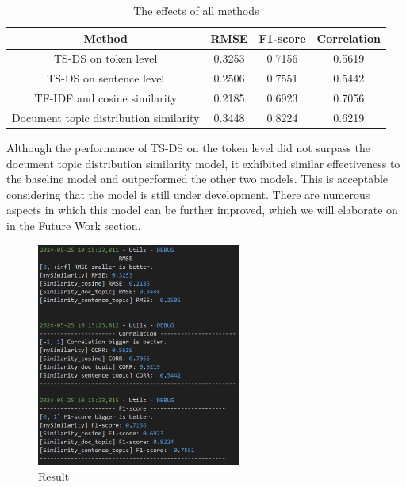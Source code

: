 \documentclass[UTF8]{ctexart}
\begin{document}
{    \begin{table}[htbp]
        \captionsetup{position=top, skip=8pt}
        \caption{The effects of all methods}
        \centering
        \begin{adjustbox}{width=0.9\textwidth}
            \begin{tabular}{c|c|c|c}
                \hline
                \textbf{\small Method} & \textbf{\small RMSE} & \textbf{\small F1-score} & \textbf{\small Correlation}  \\
                \hline
                \small TS-DS on token level & \small 0.3253 & \small 0.7156 & \small 0.5619  \\
                \hline
                \small TS-DS on sentence level & \small 0.2506 & \small 0.7551 & \small 0.5442    \\
                \hline
                \small TF-IDF and cosine similarity & \small 0.2185 & \small 0.6923 & \small 0.7056      \\
                \hline
                \small Document topic distribution similarity & \small 0.3448 & \small 0.8224 & \small 0.6219     \\
                \hline
            \end{tabular}
        \end{adjustbox}
        \label{tab:effects}
    \end{table}

    Although the performance of TS-DS on the token level did not surpass 
    the document topic distribution similarity model, 
    it exhibited similar effectiveness to the baseline model and outperformed the other two models. 
    This is acceptable considering that the model is still under development. 
    There are numerous aspects in which this model can be further improved, 
    which we will elaborate on in the Future Work section.
    \begin{figure}[htbp]
        \captionsetup{position=bottom, skip=8pt}
        \centering
        \includegraphics[width=0.6\textwidth]{result}
        \caption{Result}
        \label{fig:Result}
    \end{figure}
}
\newpage
\end{document}
